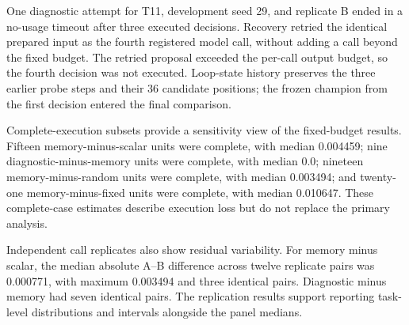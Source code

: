 One diagnostic attempt for T11, development seed 29, and replicate B ended in a no-usage timeout after three executed decisions. Recovery retried the identical prepared input as the fourth registered model call, without adding a call beyond the fixed budget. The retried proposal exceeded the per-call output budget, so the fourth decision was not executed. Loop-state history preserves the three earlier probe steps and their 36 candidate positions; the frozen champion from the first decision entered the final comparison.

Complete-execution subsets provide a sensitivity view of the fixed-budget results. Fifteen memory-minus-scalar units were complete, with median 0.004459; nine diagnostic-minus-memory units were complete, with median 0.0; nineteen memory-minus-random units were complete, with median 0.003494; and twenty-one memory-minus-fixed units were complete, with median 0.010647. These complete-case estimates describe execution loss but do not replace the primary analysis.

Independent call replicates also show residual variability. For memory minus scalar, the median absolute A--B difference across twelve replicate pairs was 0.000771, with maximum 0.003494 and three identical pairs. Diagnostic minus memory had seven identical pairs. The replication results support reporting task-level distributions and intervals alongside the panel medians.
